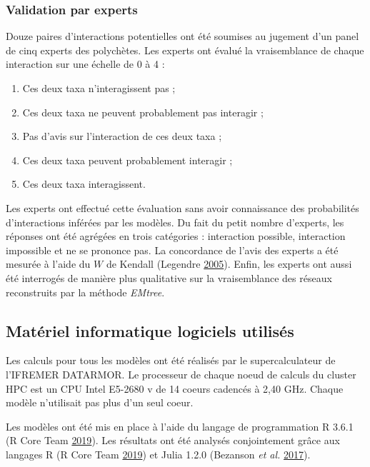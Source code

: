 \documentclass[12pt,]{article}
\begin{document}
\hypertarget{validation-par-experts}{%
\subsubsection{Validation par experts}\label{validation-par-experts}}

Douze paires d'interactions potentielles ont été soumises au jugement
d'un panel de cinq experts des polychètes. Les experts ont évalué la
vraisemblance de chaque interaction sur une échelle de 0 à 4 :

\begin{enumerate}
\def\labelenumi{\arabic{enumi}.}
\setcounter{enumi}{-1}
\item
  Ces deux taxa n'interagissent pas ;
\item
  Ces deux taxa ne peuvent probablement pas interagir ;
\item
  Pas d'avis sur l'interaction de ces deux taxa ;
\item
  Ces deux taxa peuvent probablement interagir ;
\item
  Ces deux taxa interagissent.
\end{enumerate}

Les experts ont effectué cette évaluation sans avoir connaissance des
probabilités d'interactions inférées par les modèles. Du fait du petit
nombre d'experts, les réponses ont été agrégées en trois catégories :
interaction possible, interaction impossible et ne se prononce pas. La
concordance de l'avis des experts a été mesurée à l'aide du \(W\) de
Kendall (Legendre \protect\hyperlink{ref-Legendre_2005}{2005}). Enfin,
les experts ont aussi été interrogés de manière plus qualitative sur la
vraisemblance des réseaux reconstruits par la méthode \emph{EMtree}.

\hypertarget{matuxe9riel-informatique-logiciels-utilisuxe9s}{%
\subsection{Matériel informatique logiciels
utilisés}\label{matuxe9riel-informatique-logiciels-utilisuxe9s}}

Les calculs pour tous les modèles ont été réalisés par le
supercalculateur de l'IFREMER DATARMOR. Le processeur de chaque noeud de
calculs du cluster HPC est un CPU Intel E5-2680 v de 14 coeurs cadencés
à 2,40 GHz. Chaque modèle n'utilisait pas plus d'un seul coeur.

Les modèles ont été mis en place à l'aide du langage de programmation R
3.6.1 (R Core Team \protect\hyperlink{ref-RCoreTeam_2019}{2019}). Les
résultats ont été analysés conjointement grâce aux langages R (R Core
Team \protect\hyperlink{ref-RCoreTeam_2019}{2019}) et Julia 1.2.0
(Bezanson \emph{et al.} \protect\hyperlink{ref-Bezanson_2017}{2017}).
\end{document}
